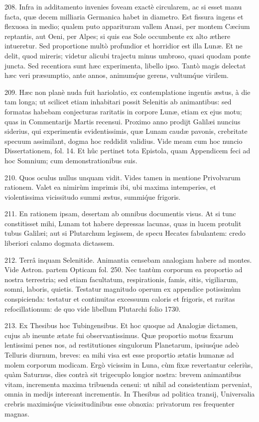 \documentclass[a4paper, 11pt, oneside, polutonikogreek, german]{article}
\begin{document}
208. Infra in additamento invenies foveam exactè circularem, ac si esset manu facta, quæ decem milliaria Germanica habet in diametro. Est fissura ingens et flexuosa in medio; qualem puto apparituram vallem Anasi, per montem Cæcium reptantis, aut Oeni, per Alpes; si quis eas Sole occumbente ex alto æthere intueretur. Sed proportione multò profundior et horridior est illa Lunæ. Et ne delit, quod mireris; videtur alicubi trajectu minus umbroso, quasi quodam ponte juncta. Sed recentiora sunt hæc experimenta, libello ipso. Tantò magis delectat hæc veri præsumptio, ante annos, animum\'que gerens, vultum\'que virilem.

209. Hæc non planè nuda fuit hariolatio, ex contemplatione ingentis æstus, à die tam longa; ut scilicet etiam inhabitari possit Selenitis ab animantibus: sed formatas habebam conjecturas raritatis in corpore Lunæ, etiam ex ejus motu; quas in Commentarijs Martis recensui. Proximo anno prodijt Galilæi nuncius siderius, qui experimentis evidentissimis, quæ Lunam caudæ pavonis, crebritate specuum assimilant, dogma hoc reddidit validius. Vide meam cum hoc nuncio Dissertationem, fol. 14. Et hûc pertinet tota Epistola, quam Appendicem feci ad hoc Somnium; cum demonstrationibus suis.

210. Quos oculus nullus unquam vidit. Vides tamen in mentione Privolvarum rationem. Valet ea nimirùm imprimis ibi, ubi maxima intemperies, et violentissima vicissitudo summi æstus, summi\'que frigoris.

211. En rationem ipsam, desertam ab omnibus documentis visus. At si tunc constitisset mihi, Lunam tot habere depressas lacunas, quas in lucem protulit tubus Galilæi; aut si Plutarchum legissem, de specu Hecates fabulantem: credo liberiori calamo dogmata dictassem.

212. Terrâ inquam Selenitide. Animantia censebam analogiam habere ad montes. Vide Astron. partem Opticam fol. 250. Nec tantùm corporum ea proportio ad nostra terrestria; sed etiam facultatum, respirationis, famis, sitis, vigiliarum, somni, laboris, quietis. Testatur magnitudo operum ex appendice potissimùm conspicienda: testatur et continuitas excessuum caloris et frigoris, et raritas refocillationum: de quo vide libellum Plutarchi folio 1730.

213. Ex Thesibus hoc Tubingensibus. Et hoc quoque ad Analogiæ dictamen, cujus ab ineunte ætate fui observantissimus. Quæ proportio motus fixarum lentissimi penes nos, ad restitutiones singulorum Planetarum, ipsius\'que adeò Telluris diurnum, breves: ea mihi visa est esse proportio ætatis humanæ ad molem corporum modicam. Ergò vicissim in Luna, cùm fixæ revertantur celeriùs, quàm Saturnus, dies contrà sit trigecuplo longior nostra: brevem animantibus vitam, incrementa maxima tribuenda censui: ut nihil ad consistentiam perveniat, omnia in medijs intereant incrementis. In Thesibus ad politica transij, Universalia crebris maximis\'que vicissitudinibus esse obnoxia: privatorum res frequenter magnas.
\end{document}

